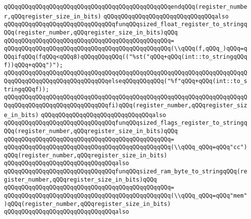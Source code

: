 \verb|qQQqqQQqqQQqqQQqqQQqqQQqqQQqqQQqqQQqqQQqqQQqqQQqendqQQq(register_number,qQQqregister_size_in_bits)|\newline
\newline
\verb|qQQqqQQqqQQqqQQqqQQqqQQqqQQqqQQqalso|\newline
\verb|qQQqqQQqqQQqqQQqqQQqqQQqqQQqqQQqfunqQQqsized_float_register_to_stringqQQq(register_number,qQQqregister_size_in_bits)qQQq|\newline
\verb|qQQqqQQqqQQqqQQqqQQqqQQqqQQqqQQqqQQqqQQqqQQqqQQq=|\newline
\verb|qQQqqQQqqQQqqQQqqQQqqQQqqQQqqQQqqQQqqQQqqQQqqQQq(\\qQQq(f,qQQq_)qQQq=qQQqifqQQq(fqQQq<qQQq8)qQQqqQQqqQQq(("%st("qQQq+qQQq(int::to_stringqQQqf))qQQq+qQQq")");|\newline
\verb|qQQqqQQqqQQqqQQqqQQqqQQqqQQqqQQqqQQqqQQqqQQqqQQqqQQqqQQqqQQqqQQqqQQqqQQqqQQqqQQqqQQqqQQqqQQqqQQqqQQqelseqQQqqQQqqQQq("%f"qQQq+qQQq(int::to_stringqQQqf));|\newline
\verb|qQQqqQQqqQQqqQQqqQQqqQQqqQQqqQQqqQQqqQQqqQQqqQQqqQQqqQQqqQQqqQQqqQQqqQQqqQQqqQQqqQQqqQQqqQQqqQQqqQQqfi)qQQq(register_number,qQQqregister_size_in_bits)|\newline
\newline
\verb|qQQqqQQqqQQqqQQqqQQqqQQqqQQqqQQqalso|\newline
\verb|qQQqqQQqqQQqqQQqqQQqqQQqqQQqqQQqfunqQQqsized_flags_register_to_stringqQQq(register_number,qQQqregister_size_in_bits)qQQq|\newline
\verb|qQQqqQQqqQQqqQQqqQQqqQQqqQQqqQQqqQQqqQQqqQQqqQQq=|\newline
\verb|qQQqqQQqqQQqqQQqqQQqqQQqqQQqqQQqqQQqqQQqqQQqqQQq(\\qQQq_qQQq=qQQq"cc")qQQq(register_number,qQQqregister_size_in_bits)|\newline
\newline
\verb|qQQqqQQqqQQqqQQqqQQqqQQqqQQqqQQqalso|\newline
\verb|qQQqqQQqqQQqqQQqqQQqqQQqqQQqqQQqfunqQQqsized_ram_byte_to_stringqQQq(register_number,qQQqregister_size_in_bits)qQQq|\newline
\verb|qQQqqQQqqQQqqQQqqQQqqQQqqQQqqQQqqQQqqQQqqQQqqQQq=|\newline
\verb|qQQqqQQqqQQqqQQqqQQqqQQqqQQqqQQqqQQqqQQqqQQqqQQq(\\qQQq_qQQq=qQQq"mem")qQQq(register_number,qQQqregister_size_in_bits)|\newline
\newline
\verb|qQQqqQQqqQQqqQQqqQQqqQQqqQQqqQQqalso|\newline

